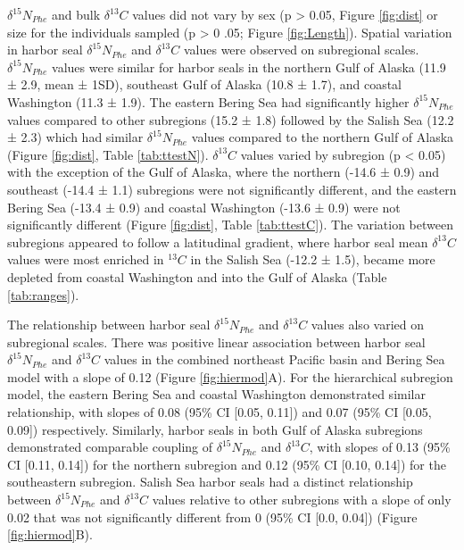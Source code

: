\documentclass [11pt, proquest] {uwthesis}[2015/03/03]
\begin{document}
\(\delta^{15}N_{Phe}\) and bulk \(\delta^{13}C\) values did not vary by
sex (p \textgreater{} 0.05, Figure \ref{fig:dist} or size for the
individuals sampled (p \textgreater{} 0 .05; Figure \ref{fig:Length}).
Spatial variation in harbor seal \(\delta^{15}N_{Phe}\) and
\(\delta^{13}C\) values were observed on subregional scales.
\(\delta^{15}N_{Phe}\) values were similar for harbor seals in the
northern Gulf of Alaska (11.9 ± 2.9, mean ± 1SD), southeast Gulf of
Alaska (10.8 ± 1.7), and coastal Washington (11.3 ± 1.9). The eastern
Bering Sea had significantly higher \(\delta^{15}N_{Phe}\) values
compared to other subregions (15.2 ± 1.8) followed by the Salish Sea
(12.2 ± 2.3) which had similar \(\delta^{15}N_{Phe}\) values compared to
the northern Gulf of Alaska (Figure \ref{fig:dist}, Table
\ref{tab:ttestN}). \(\delta^{13}C\) values varied by subregion (p
\textless{} 0.05) with the exception of the Gulf of Alaska, where the
northern (-14.6 ± 0.9) and southeast (-14.4 ± 1.1) subregions were not
significantly different, and the eastern Bering Sea (-13.4 ± 0.9) and
coastal Washington (-13.6 ± 0.9) were not significantly different
(Figure \ref{fig:dist}, Table \ref{tab:ttestC}). The variation between
subregions appeared to follow a latitudinal gradient, where harbor seal
mean \(\delta^{13}C\) values were most enriched in \(^{13}C\) in the
Salish Sea (-12.2 ± 1.5), became more depleted from coastal Washington
and into the Gulf of Alaska (Table \ref{tab:ranges}).

The relationship between harbor seal \(\delta^{15}N_{Phe}\) and
\(\delta^{13}C\) values also varied on subregional scales. There was
positive linear association between harbor seal \(\delta^{15}N_{Phe}\)
and \(\delta^{13}C\) values in the combined northeast Pacific basin and
Bering Sea model with a slope of 0.12 (Figure \ref{fig:hiermod}A). For
the hierarchical subregion model, the eastern Bering Sea and coastal
Washington demonstrated similar relationship, with slopes of 0.08 (95\%
CI {[}0.05, 0.11{]}) and 0.07 (95\% CI {[}0.05, 0.09{]}) respectively.
Similarly, harbor seals in both Gulf of Alaska subregions demonstrated
comparable coupling of \(\delta^{15}N_{Phe}\) and \(\delta^{13}C\), with
slopes of 0.13 (95\% CI {[}0.11, 0.14{]}) for the northern subregion and
0.12 (95\% CI {[}0.10, 0.14{]}) for the southeastern subregion. Salish
Sea harbor seals had a distinct relationship between
\(\delta^{15}N_{Phe}\) and \(\delta^{13}C\) values relative to other
subregions with a slope of only 0.02 that was not significantly
different from 0 (95\% CI {[}0.0, 0.04{]}) (Figure \ref{fig:hiermod}B).
\end{document}
